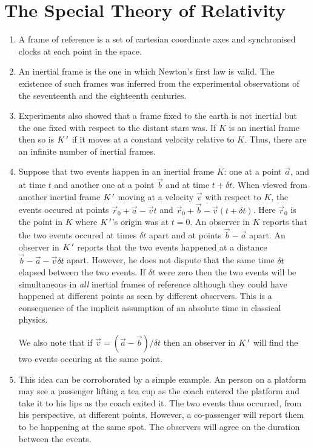 \chapter{The Special Theory of Relativity}\label{c1}
\begin{enumerate}
\item A frame of reference is a set of cartesian coordinate axes and 
synchronised clocks at each point in the space.

\item An inertial frame is the one in which Newton's first law is valid. The 
existence of such frames was inferred from the experimental observations of the
seventeenth and the eighteenth centuries.

\item Experiments also showed that a frame fixed to the earth is not inertial
but the one fixed with respect to the distant stars was. If $K$ is an inertial
frame then so is $K^{\,\prime}$ if it moves at a constant velocity relative
to $K$. Thus, there are an infinite number of inertial frames.

\item Suppose that two events happen in an inertial frame $K$: one at a point
$\vec{a}$, and at time $t$ and another one at a point $\vec{b}$ and at time 
$t + \delta t$. When viewed from another inertial frame $K^{\,\prime}$ moving at a 
velocity $\vec{v}$ with respect to $K$, the events occured at points $\vec{r}_0 
+ \vec{a} - \vec{v}t$ and $\vec{r}_0 + \vec{b} -\vec{v}(t + \delta t)$. Here 
$\vec{r}_0$ is the point in $K$ where $K^{\,\prime}$'s origin was at $t=0$. An observer 
in $K$ reports that the two events occured at times $\delta t$ apart and at points 
$\vec{b} - \vec{a}$ apart. An observer in $K^{\,\prime}$ reports that the two events 
happened at a distance $\vec{b} - \vec{a} - \vec{v}\delta t$ apart. However, 
he does not dispute that the same time $\delta t$ elapsed between the two events. 
If $\delta t$ were zero then the two events will be simultaneous in \emph{all} 
inertial frames of reference although they could have happened at different 
points as seen by different observers. This is a consequence of the implicit 
assumption of an absolute time in classical physics.

We also note that if $\vec{v} = (\vec{a} - \vec{b})/\delta t$ then an observer
in $K^{\,\prime}$ will find the two events occuring at the same point.

\item This idea can be corroborated by a simple example. An person on a platform may
see a passenger lifting a tea cup as the coach entered the platform and take it
to his lips as the coach exited it. The two events thus occurred, from his 
perspective, at different points. However, a co-passenger will report them to
be happening at the same spot. The observers will agree on the duration between
the events.


\end{enumerate}
